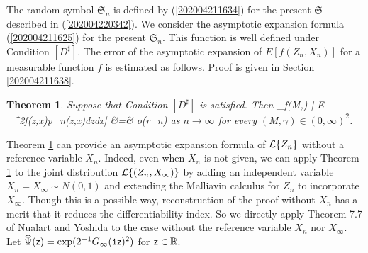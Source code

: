 \documentclass[a4paper,12pt]{article}
\newtheorem{theorem}{Theorem}[section]
\numberwithin{equation}{section}
\numberwithin{equation}{section}
\def\tti{{\tt i}}
\newcommand{\sfz}{{\sf z}}
\begin{document}
The random symbol ${\mathfrak S}_n$ is defined by (\ref{202004211634}) 
for the present ${\mathfrak S}$ described in (\ref{202004220342}). 
We consider the asymptotic expansion formula (\ref{202004211625}) 
for the present ${\mathfrak S}_n$. 
This function is well defined under Condition $[D^\sharp]$. 
The error of the asymptotic expansion of $E[f(Z_n,X_n)]$ for a measurable function $f$ 
is estimated as follows. Proof is given in Section \ref{202004211638}. 
%
\begin{theorem}\label{202004211628}
Suppose that Condition $[D^\sharp]$ is satisfied. Then 
\bea\label{202005010703}
\sup_{f\in\cale(M,\gamma)}
\bigg| E\big[f(Z_n,X_n)\big] 
-\int_{\bbR^2}f(z,x)p_n(z,x)dzdx\bigg|
&=& 
o(r_n)
\eea
as $n\to\infty$ for every $(M,\gamma)\in(0,\infty)^2$. 
\end{theorem}
\halflineskip




Theorem \ref{202004211628} can provide an asymptotic expansion formula of ${\cal L}\{Z_n\}$ 
without a reference variable $X_n$. 
Indeed, even when $X_n$ is not given, we can apply Theorem \ref{202004211628} 
to the joint distribution ${\cal L}\{(Z_n,X_\infty)\}$ by adding an independent variable $X_n=X_\infty\sim N(0,1)$ 
and extending the Malliavin calculus for $Z_n$ to incorporate $X_\infty$. 
Though this is a possible way, reconstruction of the proof without $X_n$ 
has a merit that it reduces the differentiability index. 
So we directly apply Theorem 7.7 of Nualart and Yoshida \cite{nualart2019asymptotic} 
to the case without the reference variable $X_n$ nor $X_\infty$. 
Let $\widehat{\Psi}(\sfz)=\exp(2^{-1}G_\infty(\tti\sfz)^2)$ for $\sfz\in\bbR$. 
\end{document}
